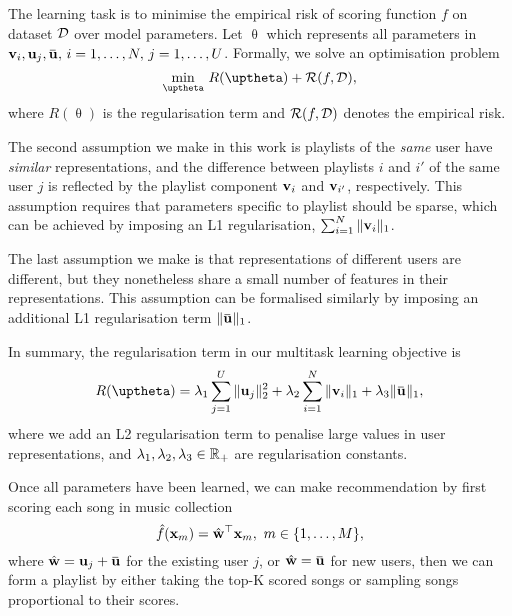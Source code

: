 %
The learning task is to minimise the empirical risk of scoring function $f$ on dataset $\mathcal{D}$ over model parameters.
Let $\uptheta$ which represents all parameters in $\bv_i, \bu_j, \widebar\bu, \, i=1,\dots,N, \, j=1,\dots,U$.
Formally, we solve an optimisation problem
\begin{equation}
\label{eq:obj}
\min_{\uptheta} \, R(\uptheta) + \RCal(f, \DCal),
\end{equation}
where $R(\uptheta)$ is the regularisation term and $\mathcal{R}(f, \mathcal{D})$ denotes the empirical risk.

The second assumption we make in this work is playlists of the \emph{same} user have \emph{similar} representations,
and the difference between playlists $i$ and $i'$ of the same user $j$ is reflected by the playlist component $\mathbf{v}_i$ 
and $\mathbf{v}_{i'}$, respectively.
This assumption requires that parameters specific to playlist should be sparse,
which can be achieved by imposing an L1 regularisation, \ie $\sum_{i=1}^N \| \mathbf{v}_i \|_1$.

The last assumption we make is that representations of different users are different, 
but they nonetheless share a small number of features in their representations.
This assumption can be formalised similarly by imposing an additional L1 regularisation term $\| \widebar\bu \|_1$.

In summary, the regularisation term in our multitask learning objective is
\begin{equation*}
R(\uptheta) = \lambda_1 \sum_{j=1}^U \|\bu_j\|_2^2 + \lambda_2 \sum_{i=1}^N \|\bv_i\|_1 + \lambda_3 \|\widebar\bu\|_1,
\end{equation*}
where we add an L2 regularisation term to penalise large values in user representations,
and $\lambda_1, \lambda_2, \lambda_3 \in \mathbb{R}_+$ are regularisation constants.

Once all parameters have been learned, we can make recommendation by first scoring each song in music collection
$$
\hat f(\mathbf{x}_m) = \hat {\mathbf{w}}^\top \mathbf{x}_m, \ m \in \{1,\dots,M\},
$$
where $\hat\w = \bu_j + \widebar\bu$ for the existing user $j$, or $\hat\w = \widebar\bu$ for new users,
then we can form a playlist by either taking the top-K scored songs or sampling songs proportional to their scores. 
